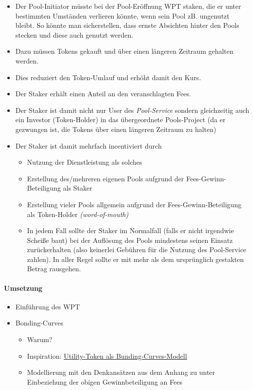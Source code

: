\begin{Konzept}
\begin{itemize}
	\item Der Pool-Initiator müsste bei der Pool-Eröffnung WPT staken, die er unter bestimmten Umständen verlieren könnte, wenn sein Pool zB. ungenutzt bleibt. So könnte man sicherstellen, dass ernste Absichten hinter den Pools stecken und diese auch genutzt werden. 	
	\item Dazu müssen Tokens gekauft und über einen längeren Zeitraum gehalten werden.
	\item Dies reduziert den Token-Umlauf und erhöht damit den Kurs.
	\item Der Staker erhält einen Anteil an den veranschlagten Fees.
	\item Der Staker ist damit nicht nur User des \textit{Pool-Service} sondern gleichzeitig auch ein Investor (Token-Holder) in das übergeordnete Pools-Project (da er gezwungen ist, die Tokens über einen längeren Zeitraum zu halten)
	\item Der Staker ist damit mehrfach incentiviert durch 
	\begin{itemize}
		\item Nutzung der Dienstleistung als solches
		\item Erstellung des/mehreren eigenen Pools aufgrund der Fees-Gewinn-Beteiligung als Staker
		\item Erstellung vieler Pools allgemein aufgrund der Fees-Gewinn-Beteiligung als Token-Holder \textit{(word-of-mouth)}
	\item In jedem Fall sollte der Staker im Normalfall (falls er nicht irgendwie Scheiße baut) bei der Auflösung des Pools mindestens seinen Einsatz zurückerhalten (also keinerlei Gebühren für die Nutzung des Pool-Service zahlen). In aller Regel sollte er mit mehr als dem ursprünglich gestakten Betrag rausgehen.
	\end{itemize}
\end{itemize}


\end{Konzept}
\vspace{0.5cm}




\paragraph{Umsetzung}
\textbf{ }
\vspace{0.3cm}


\begin{itemize}
	\item Einführung des WPT
	\item Bonding-Curves
	\begin{itemize}
		\item Warum?
		\item Inspiration: \href{https://medium.com/atchai/can-we-save-the-utility-token-55ef639370cf}{Utility-Token als Bunding-Curves-Modell}
		\item Modellierung mit den Denkansätzen aus dem Anhang zu  unter Einbeziehung der obigen Gewinnbeteiligung an Fees
	\end{itemize}	
\end{itemize}

